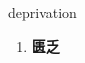 
\begin{frame}
{\huge deprivation}
\begin{center}
\begin{enumerate}\Large
  \item \textbf{匮乏}
\end{enumerate}
\end{center}
\end{frame}
